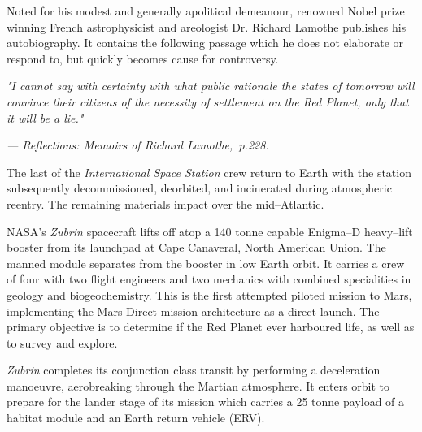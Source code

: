

Noted for his modest and generally apolitical demeanour, renowned Nobel prize winning French astrophysicist and areologist Dr. Richard Lamothe publishes his autobiography. It contains the following passage which he does not elaborate or respond to, but quickly becomes cause for controversy.

\startTimelineGeneralDocument
{\it "I cannot say with certainty with what public rationale the states of tomorrow will convince their citizens of the necessity of settlement on the Red Planet, only that it will be a lie."}

\hskip 1.5cm {\it --- Reflections: Memoirs of Richard Lamothe,~p.228.}
\stopTimelineGeneralDocument
\StopTimelineDate

The last of the {\it International Space Station} crew return to Earth with the station subsequently decommissioned, deorbited, and incinerated during atmospheric reentry. The remaining materials impact over the mid--Atlantic.
\StopTimelineDate

NASA's {\it Zubrin} spacecraft lifts off atop a 140 tonne capable Enigma--D heavy--lift booster from its launchpad at Cape Canaveral, North American Union. The manned module separates from the booster in low Earth orbit. It carries a crew of four with two flight engineers and two mechanics with combined specialities in geology and biogeochemistry. This is the first attempted piloted mission to Mars, implementing the Mars Direct mission architecture as a direct launch. The primary objective is to determine if the Red Planet ever harboured life, as well as to survey and explore.
\StopTimelineDate

{\it Zubrin} completes its conjunction class transit by performing a deceleration manoeuvre, aerobreaking through the Martian atmosphere. It enters orbit to prepare for the lander stage of its mission which carries a 25 tonne payload of a habitat module and an Earth return vehicle (ERV).
\StopTimelineDate

